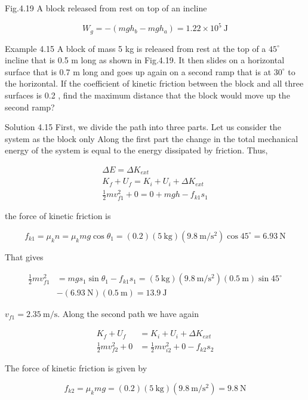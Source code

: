 \documentclass[10pt]{article}
\begin{document}
Fig.4.19 A block released from rest on top of an incline

$$
W_{g}=-\left(m g h_{b}-m g h_{a}\right)=1.22 \times 10^{5} \mathrm{~J}
$$

Example 4.15 A block of mass 5 kg is released from rest at the top of a $45^{\circ}$ incline that is 0.5 m long as shown in Fig.4.19. It then slides on a horizontal surface that is 0.7 m long and goes up again on a second ramp that is at $30^{\circ}$ to the horizontal. If the coefficient of kinetic friction between the block and all three surfaces is 0.2 , find the maximum distance that the block would move up the second ramp?

Solution 4.15 First, we divide the path into three parts. Let us consider the system as the block only Along the first part the change in the total mechanical energy of the system is equal to the energy dissipated by friction. Thus,

$$
\begin{gathered}
\Delta E=\Delta K_{e x t} \\
K_{f}+U_{f}=K_{i}+U_{i}+\Delta K_{e x t} \\
\frac{1}{2} m v_{f 1}^{2}+0=0+m g h-f_{k 1} s_{1}
\end{gathered}
$$

the force of kinetic friction is

$$
f_{k 1}=\mu_{k} n=\mu_{k} m g \cos \theta_{1}=(0.2)(5 \mathrm{~kg})\left(9.8 \mathrm{~m} / \mathrm{s}^{2}\right) \cos 45^{\circ}=6.93 \mathrm{~N}
$$

That gives

$$
\begin{aligned}
\frac{1}{2} m v_{f 1}^{2} & =m g s_{1} \sin \theta_{1}-f_{k 1} s_{1}=(5 \mathrm{~kg})\left(9.8 \mathrm{~m} / \mathrm{s}^{2}\right)(0.5 \mathrm{~m}) \sin 45^{\circ} \\
& -(6.93 \mathrm{~N})(0.5 \mathrm{~m})=13.9 \mathrm{~J}
\end{aligned}
$$

$v_{f 1}=2.35 \mathrm{~m} / \mathrm{s}$. Along the second path we have again

$$
\begin{aligned}
K_{f}+U_{f} & =K_{i}+U_{i}+\Delta K_{e x t} \\
\frac{1}{2} m v_{f 2}^{2}+0 & =\frac{1}{2} m v_{i 2}^{2}+0-f_{k 2} s_{2}
\end{aligned}
$$

The force of kinetic friction is given by

$$
f_{k 2}=\mu_{k} m g=(0.2)(5 \mathrm{~kg})\left(9.8 \mathrm{~m} / \mathrm{s}^{2}\right)=9.8 \mathrm{~N}
$$
\end{document}
